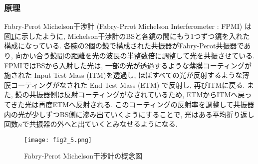 \subsubsection{原理}
\vskip3mm
Fabry-Perot Michelson干渉計 (Fabry-Prrot Michelson Interferometer : FPMI) は図\ref{fig2.5}に示したように, Michelson干渉計のBSと各鏡の間にもう1つずつ鏡を入れた構成になっている. 各腕の2個の鏡で構成された共振器がFabry-Perot共振器であり, 向かい合う鏡間の距離を光の波長の半整数倍に調整して光を共振させている. \\
\quad FPMIではBSから入射した光は, 一部の光が透過するような薄膜コーティングが施された Input Test Mass (ITM)を透過し, ほぼすべての光が反射するような薄膜コーティングがなされた End Test Mass (ETM) で反射し, 再びITMに戻る. また, 鏡の共振器側は反射コーティングがなされているため, ETMからITMへ戻ってきた光は再度ETMへ反射される. このコーティングの反射率を調整して共振器内の光が少しずつBS側に滲み出ていくようにすることで, 光はある平均折り返し回数$n$で共振器の外へと出ていくとみなせるようになる. 
\begin{figure}[H]
\begin{center}
\texttt{[image: fig2\_5.png]}
\caption[Fabry-Perot Michelson干渉計]{Fabry-Perot Michelson干渉計の概念図}
\label{fig2.5}
\end{center}
\end{figure}
